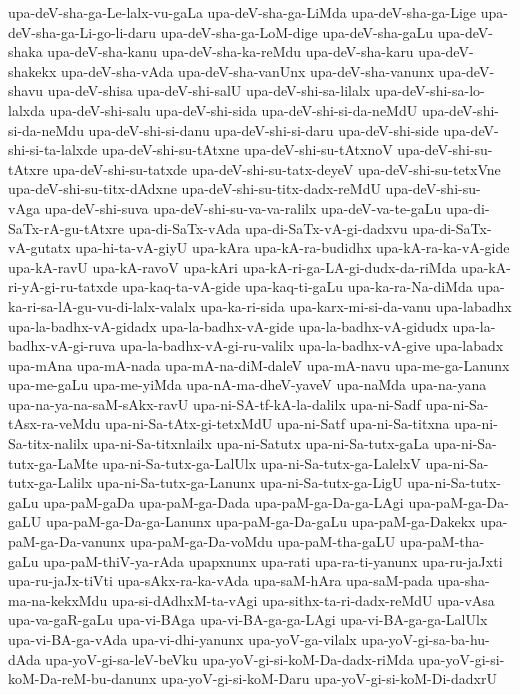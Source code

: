 {upa-deV-sha-ga-Le-lalx-vu-gaLa
upa-deV-sha-ga-LiMda
upa-deV-sha-ga-Lige
upa-deV-sha-ga-Li-go-li-daru
upa-deV-sha-ga-LoM-dige
upa-deV-sha-gaLu
upa-deV-shaka
upa-deV-sha-kanu
upa-deV-sha-ka-reMdu
upa-deV-sha-karu
upa-deV-shakekx
upa-deV-sha-vAda
upa-deV-sha-vanUnx
upa-deV-sha-vanunx
upa-deV-shavu
upa-deV-shisa
upa-deV-shi-salU
upa-deV-shi-sa-lilalx
upa-deV-shi-sa-lo-lalxda
upa-deV-shi-salu
upa-deV-shi-sida
upa-deV-shi-si-da-neMdU
upa-deV-shi-si-da-neMdu
upa-deV-shi-si-danu
upa-deV-shi-si-daru
upa-deV-shi-side
upa-deV-shi-si-ta-lalxde
upa-deV-shi-su-tAtxne
upa-deV-shi-su-tAtxnoV
upa-deV-shi-su-tAtxre
upa-deV-shi-su-tatxde
upa-deV-shi-su-tatx-deyeV
upa-deV-shi-su-tetxVne
upa-deV-shi-su-titx-dAdxne
upa-deV-shi-su-titx-dadx-reMdU
upa-deV-shi-su-vAga
upa-deV-shi-suva
upa-deV-shi-su-va-va-ralilx
upa-deV-va-te-gaLu
upa-di-SaTx-rA-gu-tAtxre
upa-di-SaTx-vAda
upa-di-SaTx-vA-gi-dadxvu
upa-di-SaTx-vA-gutatx
upa-hi-ta-vA-giyU
upa-kAra
upa-kA-ra-budidhx
upa-kA-ra-ka-vA-gide
upa-kA-ravU
upa-kA-ravoV
upa-kAri
upa-kA-ri-ga-LA-gi-dudx-da-riMda
upa-kA-ri-yA-gi-ru-tatxde
upa-kaq-ta-vA-gide
upa-kaq-ti-gaLu
upa-ka-ra-Na-diMda
upa-ka-ri-sa-lA-gu-vu-di-lalx-valalx
upa-ka-ri-sida
upa-karx-mi-si-da-vanu
upa-labadhx
upa-la-badhx-vA-gidadx
upa-la-badhx-vA-gide
upa-la-badhx-vA-gidudx
upa-la-badhx-vA-gi-ruva
upa-la-badhx-vA-gi-ru-valilx
upa-la-badhx-vA-give
upa-labadx
upa-mAna
upa-mA-nada
upa-mA-na-diM-daleV
upa-mA-navu
upa-me-ga-Lanunx
upa-me-gaLu
upa-me-yiMda
upa-nA-ma-dheV-yaveV
upa-naMda
upa-na-yana
upa-na-ya-na-saM-sAkx-ravU
upa-ni-SA-tf-kA-la-dalilx
upa-ni-Sadf
upa-ni-Sa-tAsx-ra-veMdu
upa-ni-Sa-tAtx-gi-tetxMdU
upa-ni-Satf
upa-ni-Sa-titxna
upa-ni-Sa-titx-nalilx
upa-ni-Sa-titxnlailx
upa-ni-Satutx
upa-ni-Sa-tutx-gaLa
upa-ni-Sa-tutx-ga-LaMte
upa-ni-Sa-tutx-ga-LalUlx
upa-ni-Sa-tutx-ga-LalelxV
upa-ni-Sa-tutx-ga-Lalilx
upa-ni-Sa-tutx-ga-Lanunx
upa-ni-Sa-tutx-ga-LigU
upa-ni-Sa-tutx-gaLu
upa-paM-gaDa
upa-paM-ga-Dada
upa-paM-ga-Da-ga-LAgi
upa-paM-ga-Da-gaLU
upa-paM-ga-Da-ga-Lanunx
upa-paM-ga-Da-gaLu
upa-paM-ga-Dakekx
upa-paM-ga-Da-vanunx
upa-paM-ga-Da-voMdu
upa-paM-tha-gaLU
upa-paM-tha-gaLu
upa-paM-thiV-ya-rAda
upapxnunx
upa-rati
upa-ra-ti-yanunx
upa-ru-jaJxti
upa-ru-jaJx-tiVti
upa-sAkx-ra-ka-vAda
upa-saM-hAra
upa-saM-pada
upa-sha-ma-na-kekxMdu
upa-si-dAdhxM-ta-vAgi
upa-sithx-ta-ri-dadx-reMdU
upa-vAsa
upa-va-gaR-gaLu
upa-vi-BAga
upa-vi-BA-ga-ga-LAgi
upa-vi-BA-ga-ga-LalUlx
upa-vi-BA-ga-vAda
upa-vi-dhi-yanunx
upa-yoV-ga-vilalx
upa-yoV-gi-sa-ba-hu-dAda
upa-yoV-gi-sa-leV-beVku
upa-yoV-gi-si-koM-Da-dadx-riMda
upa-yoV-gi-si-koM-Da-reM-bu-danunx
upa-yoV-gi-si-koM-Daru
upa-yoV-gi-si-koM-Di-dadxrU
}
